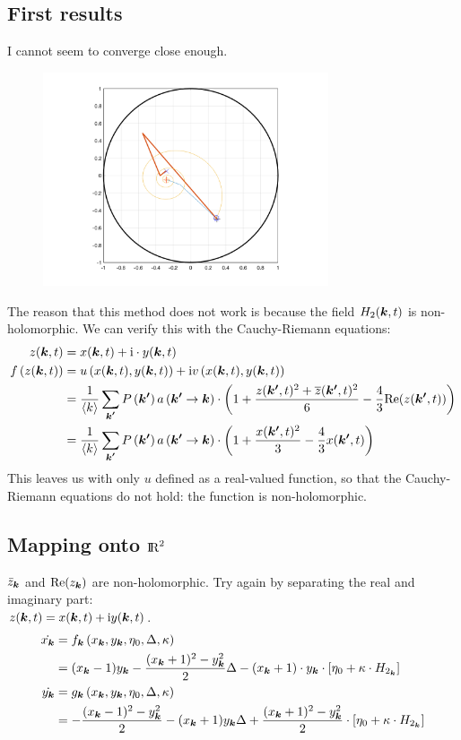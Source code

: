 \subsection{First results}
I cannot seem to converge close enough.
\begin{figure}[H]
\centering
\includegraphics[width = 0.75\textwidth]{../Figures/ProblemsWithNewtonRaphson.png}
\end{figure}

The reason that this method does not work is because the field $H_2({\boldsymbol{k}},t)$ is non-holomorphic. We can verify this with the Cauchy-Riemann equations:
\begin{align*}
z({\boldsymbol{k}},t) &= x({\boldsymbol{k}},t) + {\rm{i}} \cdot y({\boldsymbol{k}},t)\\
f\left( z({\boldsymbol{k}},t) \right) &= u\left(x({\boldsymbol{k}}, t), y({\boldsymbol{k}}, t) \right) + {\rm{i}} v\left(x({\boldsymbol{k}}, t), y({\boldsymbol{k}}, t) \right)\\
&= \frac{1}{{\langle k\rangle}} \sum_{{\boldsymbol{k'}}} P\left({\boldsymbol{k'}}\right) a\left({\boldsymbol{k'}} \rightarrow {\boldsymbol{k}}\right) \cdot \left( 1 + \frac{z({\boldsymbol{k'}}, t)^2 + \overline{z}({\boldsymbol{k'}}, t)^2}{6} - \frac{4}{3} {\operatorname{Re}}(z({\boldsymbol{k'}}, t)) \right)\\
&= \frac{1}{{\langle k\rangle}} \sum_{{\boldsymbol{k'}}} P\left({\boldsymbol{k'}}\right) a\left({\boldsymbol{k'}} \rightarrow {\boldsymbol{k}}\right) \cdot \left( 1 + \frac{x({\boldsymbol{k'}}, t)^2}{3} - \frac{4}{3} x({\boldsymbol{k'}}, t) \right)
\end{align*}
This leaves us with only $u$ defined as a real-valued function, so that the Cauchy-Riemann equations do not hold: the function is non-holomorphic. 
 
\subsection{Mapping onto ${\rm I\!R}^2$}
$\bar{z}_{{\boldsymbol{k}}}$ and ${\operatorname{Re}}(z_{{\boldsymbol{k}}})$ are non-holomorphic. Try again by separating the real and imaginary part: \\
$z({\boldsymbol{k}},t) = x({\boldsymbol{k}},t) + {\rm{i}} y({\boldsymbol{k}},t)$.
\begin{align*}
\dot{x_{{\boldsymbol{k}}}} 
&=f_{{\boldsymbol{k}}} \left(x_{{\boldsymbol{k}}}, y_{{\boldsymbol{k}}}, \eta_{0}, \Delta, \kappa \right) \\ 
&=(x_{{\boldsymbol{k}}}-1) y_{{\boldsymbol{k}}}-\frac{(x_{{\boldsymbol{k}}}+1)^{2}-y_{{\boldsymbol{k}}}^{2}}{2} \Delta-(x_{{\boldsymbol{k}}}+1) \cdot y_{{\boldsymbol{k}}} \cdot \left[\eta_{0}+ \kappa \cdot H_{2_{{\boldsymbol{k}}}}\right] \\ 
\dot{y_{{\boldsymbol{k}}}} &= g_{{\boldsymbol{k}}} \left(x_{{\boldsymbol{k}}}, y_{{\boldsymbol{k}}}, \eta_{0}, \Delta, \kappa \right) \\ 
&=-\frac{(x_{{\boldsymbol{k}}}-1)^{2}-y_{{\boldsymbol{k}}}^{2}}{2}-(x_{{\boldsymbol{k}}}+1) y_{{\boldsymbol{k}}} \Delta+\frac{(x_{{\boldsymbol{k}}}+1)^{2}-y_{{\boldsymbol{k}}}^{2}}{2} \cdot \left[\eta_{0} + \kappa \cdot H_{2_{{\boldsymbol{k}}}} \right] 
\end{align*}

